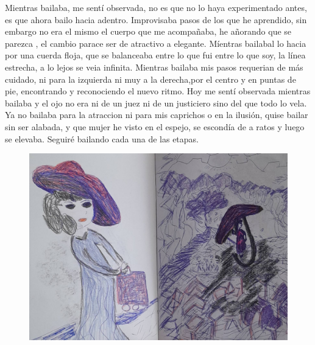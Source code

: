 \documentclass[12pt, a4paper, twoside]{book} %
\begin{document}
Mientras bailaba, me sentí observada, no es que no lo haya experimentado antes, es que ahora bailo hacia adentro.
Improvisaba pasos de los que he aprendido, sin embargo no era el mismo el cuerpo que me acompañaba, he añorando que se parezca , el cambio parace ser de atractivo a elegante.
Míentras bailabal lo hacia por una cuerda floja, que se balanceaba entre lo que fui entre lo que soy, la línea estrecha, a lo lejos se veia  infinita.
Mientras bailaba mis pasos requerian de más cuidado, ni para la izquierda ni muy a la derecha,por el centro y en puntas de pie, encontrando y reconociendo el nuevo ritmo.
Hoy me sentí observada mientras bailaba y el ojo no era ni de un juez ni de un justiciero sino del que todo lo vela.
Ya no bailaba para la atraccion ni para mis caprichos o en la ilusión, quise bailar sin ser alabada, y que mujer he visto en el espejo, se escondía de a ratos y luego se elevaba.
Seguiré bailando cada una de las etapas.

\begin{figure}[H]
	\centering
	\includegraphics[width=\textwidth]{./images/1f81324df23788.jpg}
\end{figure}
\end{document}
